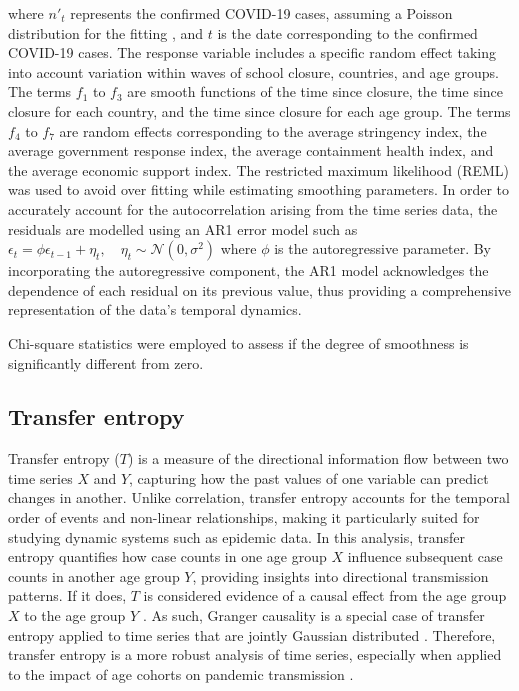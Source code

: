 \documentclass[]{interact}
\theoremstyle{plain}%
\theoremstyle{definition}
\theoremstyle{remark}
\begin{document}
\noindent where \(n\prime_t\) represents the confirmed COVID-19 cases, assuming a Poisson distribution for the fitting \citep{loader2006local}, and \(t\) is the date corresponding to the confirmed COVID-19 cases. The response variable includes a specific random effect taking into account variation within waves of school closure, countries, and age groups. The terms \(f_1\) to \(f_3\) are smooth functions of the time since closure, the time since closure for each country, and the time since closure for each age group. The terms \(f_4\) to \(f_7\) are random effects corresponding to the average stringency index, the average government response index, the average containment health index, and the average economic support index. The restricted maximum likelihood (REML) was used to avoid over fitting while estimating smoothing parameters. In order to accurately account for the autocorrelation arising from the time series data, the residuals are modelled using an AR1 error model such as \(\epsilon_t = \phi \epsilon_{t-1} + \eta_t, \quad \eta_t \sim \mathcal{N}(0, \sigma^2)\) where \(\phi\) is the autoregressive parameter. By incorporating the autoregressive component, the AR1 model acknowledges the dependence of each residual on its previous value, thus providing a comprehensive representation of the data's temporal dynamics.

Chi-square statistics were employed to assess if the degree of smoothness is significantly different from zero.

\subsection{Transfer entropy}\label{transfer-entropy}

Transfer entropy (\(T\)) is a measure of the directional information flow between two time series \(X\) and \(Y\), capturing how the past values of one variable can predict changes in another. Unlike correlation, transfer entropy accounts for the temporal order of events and non-linear relationships, making it particularly suited for studying dynamic systems such as epidemic data. In this analysis, transfer entropy quantifies how case counts in one age group \(X\) influence subsequent case counts in another age group \(Y\), providing insights into directional transmission patterns. If it does, \(T\) is considered evidence of a causal effect from the age group \(X\) to the age group \(Y\) \citep{schreiber2000measuring}. As such, Granger causality is a special case of transfer entropy applied to time series that are jointly Gaussian distributed \citep{barnett2009granger}. Therefore, transfer entropy is a more robust analysis of time series, especially when applied to the impact of age cohorts on pandemic transmission \citep{kissler2020symbolic}.
\end{document}
